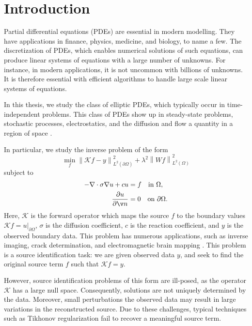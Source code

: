 \section{Introduction}

Partial differential equations (PDEs) are essential in modern modelling. They have applications in finance, physics, medicine, and biology, to name a few. The discretization of PDEs, which enables numerical solutions of such equations, can produce linear systems of equations with a large number of unknowns. For instance, in modern applications, it is not uncommon with billions of unknowns. It is therefore essential with efficient algorithms to handle large scale linear systems of equations.

In this thesis, we study the class of elliptic PDEs, which typically occur in time-independent problems. This class of PDEs show up in steady-state problems, stochastic processes, electrostatics, and the diffusion and flow a quantity in a region of space \cite{pavliotisStochasticProcessesApplications2014, evansPartialDifferentialEquations2010,straussPartialDifferentialEquations2007}.

In particular, we study the inverse problem of the form
\begin{equation}\label{eq:problem}
    \min_{f} \left\| \mathcal{K} f - y \right\|_{L^2(\partial\Omega)}^2
    + \lambda^2 \left\| W f \right\|_{L^2(\Omega)}^2
\end{equation}
subject to
\begin{eqnarray}\label{eq:pde}
    \begin{aligned}
    -\nabla \cdot \sigma\nabla u + c u &= f \quad \text{in } \Omega, \\
    \frac{\partial u}{\partial \v n} &= 0 \quad \text{on } \partial\Omega.
    \end{aligned}
\end{eqnarray}
Here, $\mathcal{K}$ is the forward operator which maps the source $f$ to the boundary values $\mathcal{K}f = u|_{\partial\Omega}$, $\sigma$ is the diffusion coefficient, $c$ is the reaction coefficient, and $y$ is the observed boundary data. This problem has numerous applications, such as inverse imaging, crack determination, and electromagnetic brain mapping \cite{nielsenComputingIschemicRegions2013,elulGenesisEEG1971,PDFRecoveryCracks}. This problem is a source identification task: we are given observed data $y$, and seek to find the original source term $f$ such that $\mathcal K f = y$.

However, source identification problems of this form are ill-posed, as the operator $\mathcal K$ has a large null space. Consequently, solutions are not uniquely determined by the data. Moreover, small perturbations the observed data may result in large variations in the reconstructed source. Due to these challenges, typical techniques such as Tikhonov regularization fail to recover a meaningful source term.

